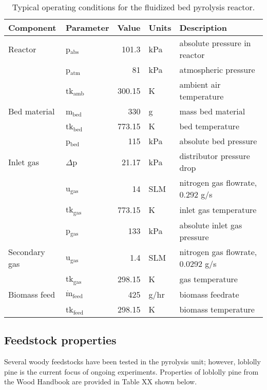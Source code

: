 \begin{table}[H]
    \centering
    \caption{Typical operating conditions for the fluidized bed pyrolysis reactor.}
    \label{tab:operating}
    \begin{tabular}{llrll}
        \toprule
        Component & Parameter & Value & Units & Description \\
        \midrule
        Reactor
            & p$_\textrm{abs}$ & 101.3 & kPa & absolute pressure in reactor \\
            & p$_\textrm{atm}$ & 81 & kPa & atmospheric pressure \\
            & tk$_\textrm{amb}$ & 300.15 & K & ambient air temperature \\
        Bed material
            & m$_\textrm{bed}$ & 330 & g & mass bed material \\
            & tk$_\textrm{bed}$ & 773.15 & K & bed temperature \\
            & p$_\textrm{bed}$ & 115 & kPa & absolute bed pressure \\
        Inlet gas
            & $\Delta$p & 21.17 & kPa & distributor pressure drop \\
            & u$_\textrm{gas}$ & 14 & SLM & nitrogen gas flowrate, 0.292 g/s \\
            & tk$_\textrm{gas}$ & 773.15 & K & inlet gas temperature \\
            & p$_\textrm{gas}$ & 133 & kPa & absolute inlet gas pressure \\
        Secondary gas
            & u$_\textrm{gas}$ & 1.4 & SLM & nitrogen gas flowrate, 0.0292 g/s \\
            & tk$_\textrm{gas}$ & 298.15 & K & gas temperature \\
        Biomass feed
            & $\dot{\textrm{m}}_\textrm{feed}$ & 425 & g/hr & biomass feedrate \\
            & tk$_\textrm{feed}$ & 298.15 & K & biomass temperature \\
        \bottomrule
    \end{tabular}
\end{table}

\subsection{Feedstock properties}

Several woody feedstocks have been tested in the pyrolysis unit; however, loblolly pine is the current focus of ongoing experiments. Properties of loblolly pine from the Wood Handbook are provided in Table XX shown below.

